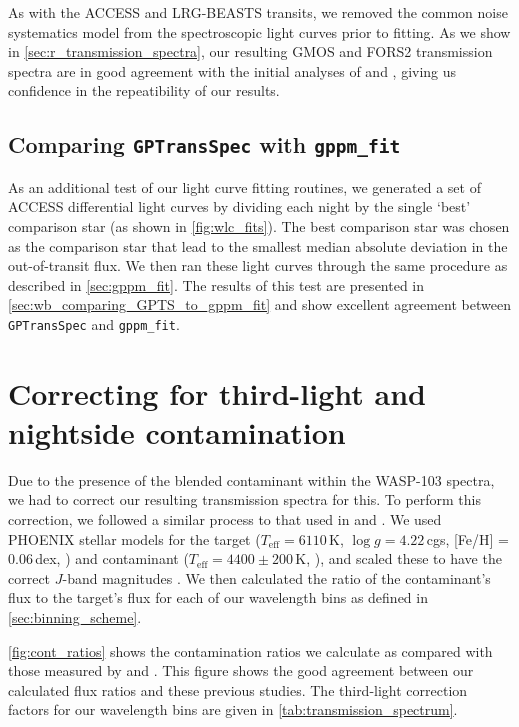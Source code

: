 \documentclass[twocolumn]{aastex63}
\newcommand{\gppmfit}{\texttt{gppm\_fit}}
\begin{document}
As with the ACCESS and LRG-BEASTS transits, we removed the common noise systematics model from the spectroscopic light curves prior to fitting. 
As we show in \autoref{sec:r_transmission_spectra}, our resulting GMOS and FORS2 transmission spectra are in good agreement with the initial analyses of \cite{Lendl2017} and \cite{Wilson2020}, giving us confidence in the repeatibility of our results.

\subsection{Comparing \texttt{GPTransSpec} with \gppmfit{}}

As an additional test of our light curve fitting routines, we generated a set of ACCESS differential light curves by dividing each night by the single `best' comparison star (as shown in \autoref{fig:wlc_fits}). The best comparison star was chosen as the comparison star that lead to the smallest median absolute deviation in the out-of-transit flux. We then ran these light curves through the same procedure as described in \autoref{sec:gppm_fit}. The results of this test are presented in \autoref{sec:wb_comparing_GPTS_to_gppm_fit} and show excellent agreement between \texttt{GPTransSpec} and \gppmfit{}.


\section{Correcting for third-light and nightside contamination}
\label{sec:3rd_light_corr}

Due to the presence of the blended contaminant within the WASP-103 spectra, we had to correct our resulting transmission spectra for this. To perform this correction, we followed a similar process to that used in \citet{Southworth2016,Cartier2017,Lendl2017,Turner2017} and \cite{Delrez2018}. We used PHOENIX \citep{Husser2013} stellar models for the target ($T_{\mathrm{eff}} = 6110$\,K, $\log g = 4.22$\,cgs, [Fe/H] = 0.06\,dex, \citealt{Delrez2018}) and contaminant ($T_{\mathrm{eff}} = 4400 \pm 200$\,K, \citealt{Cartier2017}), and scaled these to have the correct $J$-band magnitudes \citep{Cartier2017}. We then calculated the ratio of the contaminant's flux to the target's flux for each of our wavelength bins as defined in \autoref{sec:binning_scheme}.

\autoref{fig:cont_ratios} shows the contamination ratios we calculate as compared with those measured by \cite{Wollert2015,Ngo2016,Southworth2016,Cartier2017,Lendl2017,Delrez2018} and \cite{Wilson2020}. This figure shows the good agreement between our calculated flux ratios and these previous studies. The third-light correction factors for our wavelength bins are given in \autoref{tab:transmission_spectrum}.
\end{document}
